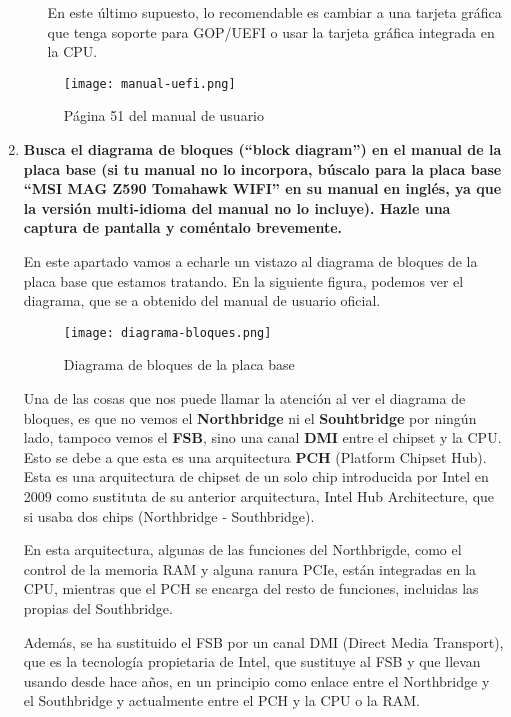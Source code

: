 \begin{enumerate}
\begin{itemize}
        En este último supuesto, lo recomendable es cambiar a una tarjeta gráfica que tenga soporte para GOP/UEFI o usar la tarjeta gráfica integrada en la CPU.
    \end{itemize}

    \begin{figure}[ht]
        \centering
        \texttt{[image: manual-uefi.png]}
        \caption{Página 51 del manual de usuario}
    \end{figure}

    \item  \textbf{Busca el diagrama de bloques (``block diagram'') en el manual de la placa base (si tu manual no lo incorpora, búscalo para la placa base ``MSI MAG Z590 Tomahawk WIFI'' en su manual en inglés, ya que la versión multi-idioma del manual no lo incluye). Hazle una captura de pantalla y coméntalo brevemente.}

    En este apartado vamos a echarle un vistazo al diagrama de bloques de la placa base que estamos tratando. En la siguiente figura, podemos ver el diagrama, que se a obtenido del manual de usuario oficial. \cite{msi03}

    \begin{figure}[ht]
        \centering
        \texttt{[image: diagrama-bloques.png]}
        \caption{Diagrama de bloques de la placa base}
    \end{figure}

    Una de las cosas que nos puede llamar la atención al ver el diagrama de bloques, es que no vemos el \textbf{Northbridge} ni el \textbf{Souhtbridge} por ningún lado, tampoco vemos el \textbf{FSB}, sino una canal \textbf{DMI} entre el chipset y la CPU. Esto se debe a que esta es una arquitectura \textbf{PCH} (Platform Chipset Hub). Esta es una arquitectura de chipset de un solo chip introducida por Intel en 2009 como sustituta de su anterior arquitectura, Intel Hub Architecture, que si usaba dos chips (Northbridge - Southbridge).

    En esta arquitectura, algunas de las funciones del Northbrigde, como el control de la memoria RAM y alguna ranura PCIe, están integradas en la CPU, mientras que el PCH se encarga del resto de funciones, incluidas las propias del Southbridge. \cite{wiki01}

    Además, se ha sustituido el FSB por un canal DMI (Direct Media Transport), que es la tecnología propietaria de Intel, que sustituye al FSB y que llevan usando desde hace años, en un principio como enlace entre el Northbridge y el Southbridge y actualmente entre el PCH y la CPU o la RAM. \cite{wiki02}


\end{enumerate}

